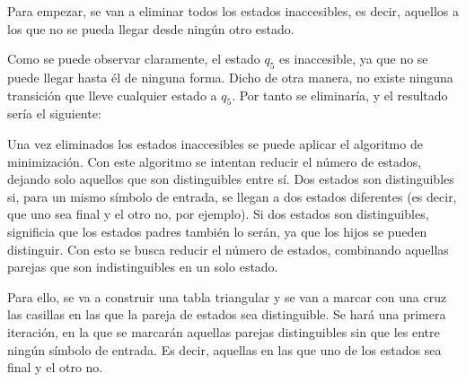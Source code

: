 \documentclass[11pt,a4paper]{article}
\begin{document}
		Para empezar, se van a eliminar todos los estados inaccesibles, es decir, aquellos a los que no se pueda llegar
		desde ningún otro estado. \par
		
		Como se puede observar claramente, el estado $q_5$ es inaccesible, ya que no se puede llegar hasta él de ninguna
		forma. Dicho de otra manera, no existe ninguna transición que lleve cualquier estado a $q_5$. Por tanto se eliminaría,
		y el resultado sería el siguiente:
		
		\begin{center}
		\end{center}
		
		Una vez eliminados los estados inaccesibles se puede aplicar el algoritmo de minimización. Con este algoritmo se
		intentan reducir el número de estados, dejando solo aquellos que son distinguibles entre sí. Dos estados son
		distinguibles si, para un mismo símbolo de entrada, se llegan a dos estados diferentes (es decir, que uno sea final
		y el otro no, por ejemplo). Si dos estados son distinguibles, significia que los estados padres también lo serán, ya
		que los hijos se pueden distinguir. Con esto se busca reducir el número de estados, combinando aquellas parejas que son
		indistinguibles en un solo estado.
		\par
		
		Para ello, se va a construir una tabla triangular y se van a marcar con una cruz las casillas en las que la pareja
		de estados sea distinguible. Se hará una primera iteración, en la que se marcarán aquellas parejas distinguibles sin
		que les entre ningún símbolo de entrada. Es decir, aquellas en las que uno de los estados sea final y el otro no. \par
		
\end{document}
